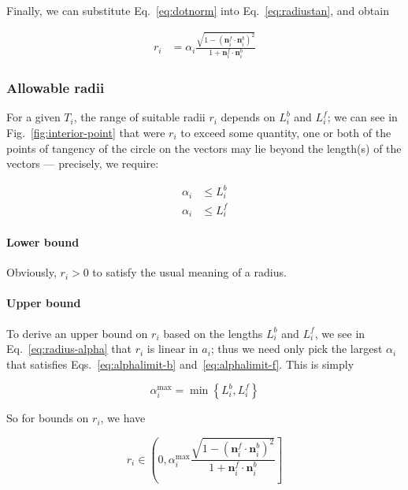 \documentclass{article}
\begin{document}
Finally, we can substitute Eq.~\eqref{eq:dotnorm} into Eq.~\eqref{eq:radiustan}, and obtain

\begin{align}
  \label{eq:radius-alpha}
  r_{i} &= \alpha_i\frac{\sqrt{1-\left(\mathbf{n}^f_i\cdot \mathbf{n}^b_i\right)^{2}}}{1+\mathbf{n}^f_i\cdot \mathbf{n}^b_i}
\end{align}

\subsubsection{Allowable radii}

For a given $T_{i}$, the range of suitable radii $r_{i}$ depends on $L^b_i$ and $L^f_i$; we can see in Fig.~\ref{fig:interior-point} that were $r_{i}$ to exceed some quantity, one or both of the points of tangency of the circle on the vectors may lie beyond the length(s) of the vectors --- precisely, we require:

\begin{align}
  \label{eq:alphalimit-b}
  \alpha_i &\le L^{b}_{i}\\
  \label{eq:alphalimit-f}
  \alpha_i &\le L^{f}_{i}
\end{align}

\paragraph{Lower bound}

Obviously, $r_i > 0$ to satisfy the usual meaning of a radius.

\paragraph{Upper bound}

To derive an upper bound on $r_{i}$ based on the lengths $L^b_i$ and $L^f_i$, we see in Eq.~\eqref{eq:radius-alpha} that $r_{i}$ is linear in $a_{i}$; thus we need only pick the largest $\alpha_i$ that satisfies Eqs.~\eqref{eq:alphalimit-b} and~\eqref{eq:alphalimit-f}.  This is simply

\begin{equation}
  \label{eq:alpha-max}
  \alpha^{\max}_i = \min \left\{L^{b}_{i}, L^{f}_{i}\right\}
\end{equation}

So for bounds on $r_{i}$, we have

\begin{equation}
  \label{eq:rbounds}
  r_{i} \in \left(0, \alpha^{\max}_i \frac{\sqrt{1-\left(\mathbf{n}^f_i\cdot \mathbf{n}^b_i\right)^{2}}}{1+\mathbf{n}^f_i\cdot \mathbf{n}^b_i}\right]
\end{equation}
\end{document}
